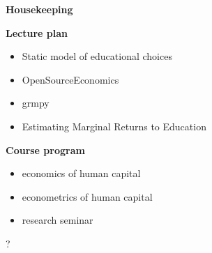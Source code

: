 \begin{frame}\begin{center}
	\LARGE\textbf{Housekeeping}
\end{center}\end{frame}
\begin{frame}\textbf{Lecture plan}\vspace{0.3cm}

\begin{itemize}\setlength\itemsep{1em}
\item Static model of educational choices
\item OpenSourceEconomics
\item grmpy
\item Estimating Marginal Returns to Education \cite{Carneiro.2011}
\end{itemize}

\end{frame}
\begin{frame}\textbf{Course program}\vspace{0.3cm}

\begin{itemize}\setlength\itemsep{1em}
\item economics of human capital
\item econometrics of human capital
\item research seminar
\end{itemize}

\end{frame}
\begin{frame}\begin{center}
{\fontsize{125}{60}\selectfont ?}
\end{center}\end{frame}
